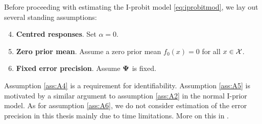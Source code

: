Before proceeding with estimating the I-probit model \cref{eq:iprobitmod}, we lay out several standing assumptions:
\begin{enumerate}[label=A\arabic*,ref=A\arabic*]
  \setcounter{enumi}{3}
  \item \textbf{Centred responses}. Set $\alpha = 0$. \label{ass:A4}  
  \item \textbf{Zero prior mean}. Assume a zero prior mean $f_0(x) = 0$ for all $x\in{\mathcal X}$. \label{ass:A5} 
  \item \textbf{Fixed error precision}. Assume ${\bm\Psi}$ is fixed. \label{ass:A6} 
\end{enumerate}
Assumption \ref{ass:A4} is a requirement for identifiability.
Assumption \ref{ass:A5} is motivated by a similar argument to assumption \ref{ass:A2} in the normal I-prior model.
As for assumption \ref{ass:A6}, we do not consider estimation of the error precision in this thesis mainly due to time limitations. 
More on this in .

